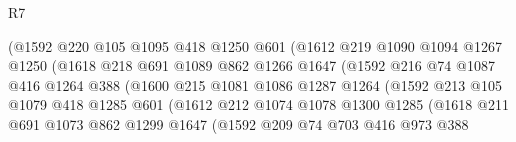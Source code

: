 \begin{lexlean}{R7}
\begin{coremodule}
                            (@1592
                              @220
                              @105
                              @1095
                              @418
                              @1250
                              @601
                              (@1612
                                @219
                                @1090
                                @1094
                                @1267
                                @1250
                                (@1618
                                  @218
                                  @691
                                  @1089
                                  @862
                                  @1266
                                  @1647
                                  (@1592
                                    @216
                                    @74
                                    @1087
                                    @416
                                    @1264
                                    @388
                                    (@1600
                                      @215
                                      @1081
                                      @1086
                                      @1287
                                      @1264
                                      (@1592
                                        @213
                                        @105
                                        @1079
                                        @418
                                        @1285
                                        @601
                                        (@1612
                                          @212
                                          @1074
                                          @1078
                                          @1300
                                          @1285
                                          (@1618
                                            @211
                                            @691
                                            @1073
                                            @862
                                            @1299
                                            @1647
                                            (@1592
                                              @209
                                              @74
                                              @703
                                              @416
                                              @973
                                              @388

\end{coremodule}
\end{lexlean}
